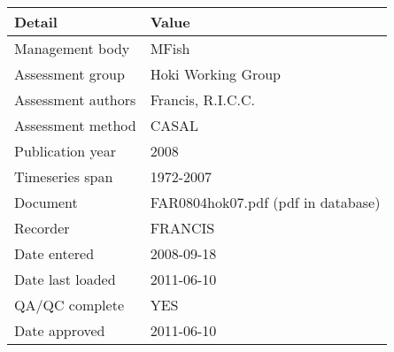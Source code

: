 \begin{table}[htb]
\centering
\begin{tabular}{ll}
\toprule
Detail & Value \\
\midrule
Management body    & MFish                              \\
Assessment group   & Hoki Working Group                 \\
Assessment authors & Francis, R.I.C.C.                  \\
Assessment method  & CASAL                              \\
Publication year   & 2008                               \\
Timeseries span    & 1972-2007                          \\
Document           & FAR0804hok07.pdf (pdf in database) \\
Recorder           & FRANCIS                            \\
Date entered       & 2008-09-18                         \\
Date last loaded   & 2011-06-10                         \\
QA/QC complete     & YES                                \\
Date approved      & 2011-06-10                         \\
\bottomrule
\end{tabular}
\label{tab:assessdet}
\end{table}
